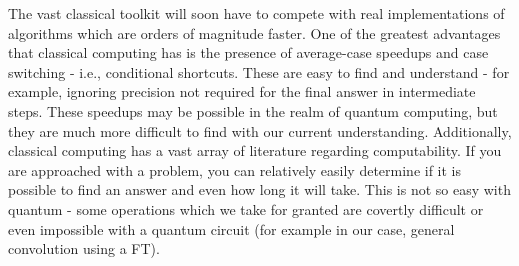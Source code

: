 \documentclass[a4paper,11pt]{article}
\theoremstyle{mytheor}
\begin{document}
The vast classical toolkit will soon have to compete with real implementations of algorithms which are orders of magnitude faster. One of the greatest advantages that classical computing has is the presence of average-case speedups and case switching - i.e., conditional shortcuts. These are easy to find and understand - for example, ignoring precision not required for the final answer in intermediate steps. These speedups may be possible in the realm of quantum computing, but they are much more difficult to find with our current understanding. Additionally, classical computing has a vast array of literature regarding computability. If you are approached with a problem, you can relatively easily determine if it is possible to find an answer and even how long it will take. This is not so easy with quantum - some operations which we take for granted are covertly difficult or even impossible with a quantum circuit (for example in our case, general convolution using a FT).
\end{document}
